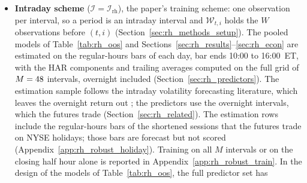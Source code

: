 \begin{itemize}
\item \textbf{Intraday scheme} ($\mathcal I = \mathcal I_{\mathrm{rh}}$), the paper's training scheme: one observation
  per interval, so a period is an intraday interval and $\mathcal W_{t,i}$ holds the $W$ observations before $(t,i)$
  (Section~\ref{sec:rh_methods_setup}). The pooled models of Table~\ref{tab:rh_oos} and
  Sections~\ref{sec:rh_results}--\ref{sec:rh_econ} are estimated on the \rhorNBars{} regular-hours bars of each
  day, bar ends 10:00 to 16:00~ET, with the HAR components and trailing averages computed on the full grid of
  $M = 48$ intervals, overnight included (Section~\ref{sec:rh_predictors}). The estimation sample
  follows the intraday volatility forecasting literature, which leaves the overnight return out
  \citep{EngleSokalska2012,ZhangZhangCucuringuQian2024}; the predictors use the overnight intervals, which the
  futures trade (Section~\ref{sec:rh_related}).
  The estimation rows include the regular-hours bars of the shortened sessions that the futures trade on NYSE
  holidays; those bars are forecast but not scored (Appendix~\ref{app:rh_robust_holiday}). Training on all $M$
  intervals or on the closing half hour alone is reported in Appendix~\ref{app:rh_robust_train}.
  In the design of the models of Table~\ref{tab:rh_oos}, the full predictor set has \rhorNColsAf{}

\end{itemize}
